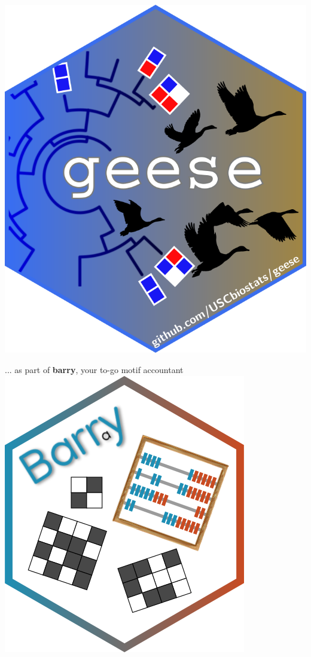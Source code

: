 \documentclass[aspectratio=169, 9pt]{beamer}
\begin{document}
\begin{frame}[c]
	\centering
	\includegraphics[width=.25\linewidth]{fig/geese-logo.png}
	
	
	\vfill\hfill{... as part of \textbf{barry}, your to-go motif accountant \includegraphics[width=.075\linewidth]{fig/barry-logo.png}}
\end{frame}
\end{document}
